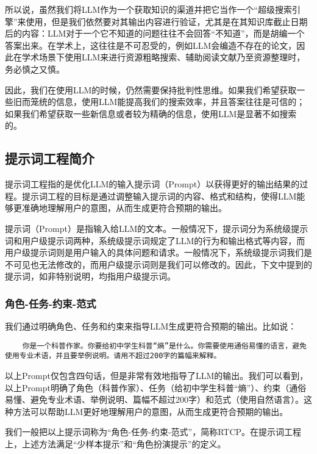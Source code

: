所以说，虽然我们将LLM作为一个获取知识的渠道并把它当作一个“超级搜索引擎”来使用，但是我们依然要对其输出内容进行验证，尤其是在其知识库截止日期后的内容：LLM对于一个它不知道的问题往往不会回答“不知道”，而是胡编一个答案出来。在学术上，这往往是不可忍受的，例如LLM会编造不存在的论文，因此在学术场景下使用LLM来进行资源粗略搜索、辅助阅读文献乃至资源整理时，务必慎之又慎。

因此，我们在使用LLM的时候，仍然需要保持批判性思维。如果我们希望获取一些旧而笼统的信息，使用LLM能提高我们的搜索效率，并且答案往往是可信的；如果我们希望获取一些新信息或者较为精确的信息，使用LLM是显著不如搜索的。

\subsection{提示词工程简介}

提示词工程指的是优化LLM的输入提示词（Prompt）以获得更好的输出结果的过程。提示词工程的目标是通过调整输入提示词的内容、格式和结构，使得LLM能够更准确地理解用户的意图，从而生成更符合预期的输出。

提示词（Prompt）是指输入给LLM的文本。一般情况下，提示词分为系统级提示词和用户级提示词两种，系统级提示词规定了LLM的行为和输出格式等内容，而用户级提示词则是用户输入的具体问题和请求。一般情况下，系统级提示词我们是不可见也无法修改的，而用户级提示词则是我们可以修改的。因此，下文中提到的提示词，如非特别说明，均指用户级提示词。

\subsubsection{角色-任务-约束-范式}

我们通过明确角色、任务和约束来指导LLM生成更符合预期的输出。比如说：

\begin{lstlisting}
    你是一个科普作家。你要给初中学生科普“熵”是什么。你需要使用通俗易懂的语言，避免使用专业术语，并且要举例说明。请用不超过200字的篇幅来解释。
\end{lstlisting}

以上Prompt仅包含四句话，但是非常有效地指导了LLM的输出。我们可以看到，以上Prompt明确了角色（科普作家）、任务（给初中学生科普“熵”）、约束（通俗易懂、避免专业术语、举例说明、篇幅不超过200字）和范式（使用自然语言）。这种方法可以帮助LLM更好地理解用户的意图，从而生成更符合预期的输出。

我们一般把以上提示词称为“角色-任务-约束-范式”，简称RTCP。在提示词工程上，上述方法满足“少样本提示”和“角色扮演提示”的定义。

